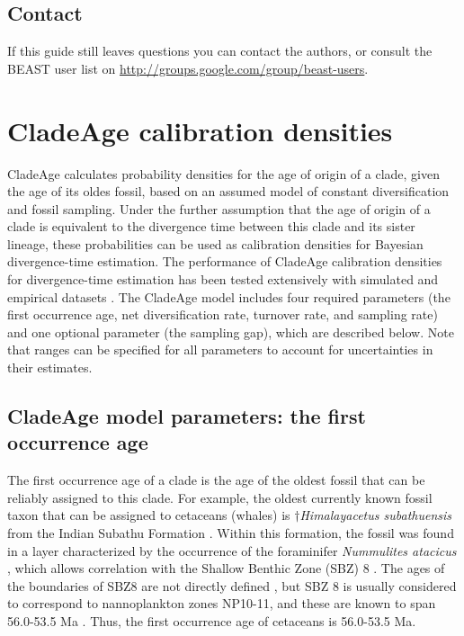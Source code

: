 \documentclass{article}
\begin{document}
\subsection{Contact}
If this guide still leaves questions you can contact the authors,
or consult the BEAST user list on \href{http://groups.google.com/group/beast-users}{http://groups.google.com/group/beast-users}.

\section{CladeAge calibration densities}

CladeAge calculates probability densities for the age of origin of a clade, given the age of its oldes fossil, based on an assumed model of constant diversification and fossil sampling. Under the further assumption that the age of origin of a clade is equivalent to the divergence time between this clade and its sister lineage, these probabilities can be used as calibration densities for Bayesian divergence-time estimation. The performance of CladeAge calibration densities for divergence-time estimation has been tested extensively with simulated and empirical datasets \citep{Matschiner:2016ga}. The CladeAge model includes four required parameters (the first occurrence age, net diversification rate, turnover rate, and sampling rate) and one optional parameter (the sampling gap), which are described below. Note that ranges can be specified for all parameters to account for uncertainties in their estimates.

\subsection{CladeAge model parameters: the first occurrence age}\label{first_occurrence_age}

The first occurrence age of a clade is the age of the oldest fossil that can be reliably assigned to this clade. For example, the oldest currently known fossil taxon that can be assigned to cetaceans (whales) is $\dagger$\textit{Himalayacetus subathuensis} from the Indian Suba\-thu Formation \citep{Benton:2015wj}. Within this formation, the fossil was found in a layer characterized by the occurrence of the foraminifer \textit{Nummulites atacicus} \citep{Bajpai:1998wm}, which allows correlation with the Shallow Benthic Zone (SBZ) 8 \citep{Vandenberghe:2012ih}. The ages of the boundaries of SBZ8 are not directly defined \citep{Vandenberghe:2012ih}, but SBZ 8 is usually considered to correspond to nannoplankton zones NP10-11, and these are known to span 56.0-53.5 Ma \citep{Vandenberghe:2012ih}. Thus, the first occurrence age of cetaceans is 56.0-53.5 Ma.
\end{document}
